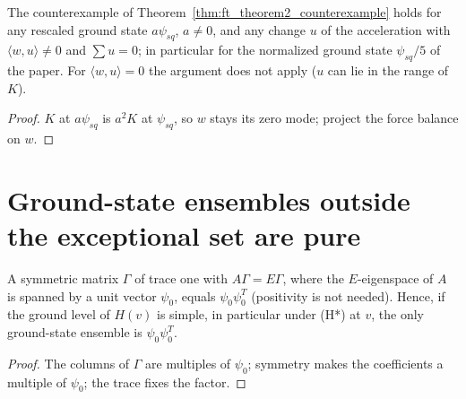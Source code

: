 \begin{theorem}
  \label{thm:prop9_general}
  \leanok
  The counterexample of Theorem~\ref{thm:ft_theorem2_counterexample} holds for any rescaled ground state $a\psi_{sq}$, $a\ne0$,
  and any change $u$ of the acceleration with $\langle w,u\rangle\ne0$ and $\sum u=0$; in particular for the
  normalized ground state $\psi_{sq}/5$ of the paper. For $\langle w,u\rangle=0$ the argument does not apply ($u$ can
  lie in the range of $K$).
\end{theorem}
\begin{proof}
  \leanok
  $K$ at $a\psi_{sq}$ is $a^2K$ at $\psi_{sq}$, so $w$ stays its zero mode; project the force balance on $w$.
\end{proof}

\section{Ground-state ensembles outside the exceptional set are pure}

\begin{lemma}
  \label{lem:eq_vecMulVec_of_simple}
  \leanok
  A symmetric matrix $\Gamma$ of trace one with $A\Gamma=E\Gamma$, where the $E$-eigenspace of $A$ is spanned by a unit
  vector $\psi_0$, equals $\psi_0\psi_0^T$ (positivity is not needed). Hence, if the ground level of $H(v)$ is simple,
  in particular under (H*) at $v$, the only ground-state ensemble is $\psi_0\psi_0^T$.
\end{lemma}
\begin{proof}
  \leanok
  The columns of $\Gamma$ are multiples of $\psi_0$; symmetry makes the coefficients a multiple of $\psi_0$; the trace
  fixes the factor.
\end{proof}

